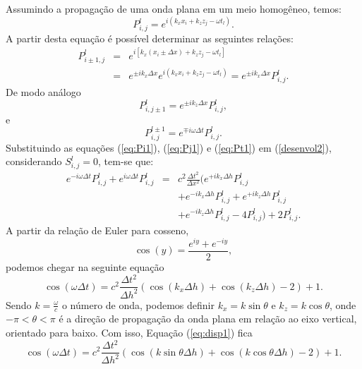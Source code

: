 Assumindo a propaga\c{c}\~ao de uma onda plana em um meio homog\^eneo, temos:
\begin{equation}
P_{i,j}^{l}=e^{i(k_{x}x_{i}+k_{z}z_{j}-\omega t_{l})}. \label{pij}
\end{equation}
A partir desta equação é possível determinar as seguintes relações:
\begin{eqnarray}
P_{i\pm1,j}^{l}&=&e^{i[k_{x}(x_{i}\pm\Delta x)+k_{z}z_{j}-\omega t_{l}]} \nonumber \\
&=&e^{\pm ik_{x}\Delta x}e^{i(k_{x}x_{i}+k_{z}z_{j}-\omega t_{l})} = e^{\pm ik_{x}\Delta x}P_{i,j}^{l}. \label{eq:Pi1}
\end{eqnarray}
De modo an\'alogo
\begin{equation}
P_{i,j\pm1}^{l}=e^{\pm ik_{z}\Delta x}P_{i,j}^{l}, \label{eq:Pj1}
\end{equation}
e 
\begin{equation}
P_{i,j}^{l\pm1}=e^{\mp i\omega\Delta t}P_{i,j}^{l}.\label{eq:Pt1}
\end{equation}
Substituindo as equações (\ref{eq:Pi1}), (\ref{eq:Pj1}) e (\ref{eq:Pt1}) em 
(\ref{desenvol2}), considerando $S_{i,j}^l=0$, tem-se que:
\begin{eqnarray}
e^{-i\omega\Delta t}P_{i,j}^{l}+e^{i\omega\Delta t}P_{i,j}^{l} 
&=&c^2\frac{\Delta t^2}{\Delta x^2}(e^{+ ik_{x}\Delta h
}P_{i,j}^{l}\\ \nonumber
& &+e^{- ik_{x}\Delta h}P_{i,j}^{l}+e^{+ik_{z}\Delta h}P_{i,j}^{l}\\ \nonumber
& &+e^{-ik_{z}\Delta h}P_{i,j}^{l}-4P_{i,j}^{l})+2P_{i,j}^{l}. 
\end{eqnarray}
A partir da relação de Euler para cosseno,
\begin{equation}
\cos(y)=\frac{e^{iy}+e^{-iy}}{2} \label{euller},
\end{equation}
podemos chegar na seguinte equação
\begin{equation}
\cos(\omega \Delta t) =c^2\frac{\Delta t^2}{\Delta h^2}(\cos(k_{x}\Delta h) + \cos(k_z\Delta h)-2) + 1.
\label{eq:disp1}
\end{equation}
Sendo $k = \frac{\omega}{c}$ o n\'umero de onda, podemos definir $k_x = k\sin \theta$ e $k_z = k \cos \theta$, onde $-\pi < \theta < \pi$ \'e a dire\c{c}\~ao de propaga\c{c}\~ao da onda plana em rela\c{c}\~ao ao eixo vertical, orientado para baixo. Com isso, Equação (\ref{eq:disp1}) fica
\begin{equation}
\cos(\omega \Delta t)=c^2\frac{\Delta t^2}{\Delta h^2}(\cos(k\sin \theta\Delta h) + \cos(k \cos\theta\Delta h)-2)+ 1.
\label{eq:disp2}
\end{equation}

